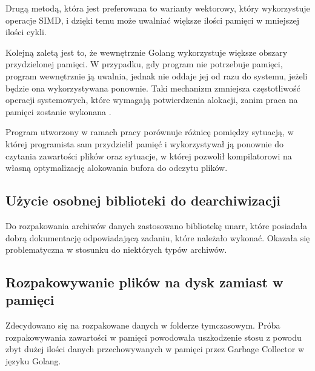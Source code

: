 Drugą metodą, która jest preferowana to warianty wektorowy, który wykorzystuje 
operacje SIMD, i dzięki temu może uwalniać większe ilości pamięci w mniejszej
ilości cykli. 

Kolejną zaletą jest to, że wewnętrznie Golang wykorzystuje większe obszary
przydzielonej pamięci. W przypadku, gdy program nie potrzebuje pamięci, program
wewnętrznie ją uwalnia, jednak nie oddaje jej od razu do systemu, jeżeli będzie 
ona wykorzystywana ponownie. Taki mechanizm zmniejsza częstotliwość operacji
systemowych, które wymagają potwierdzenia alokacji, zanim praca na pamięci 
zostanie wykonana \cite{bib:internet:GolangMemoryModel}. 

Program utworzony w ramach pracy porównuje różnicę pomiędzy sytuacją, w której
programista sam przydzielił pamięć i wykorzystywał ją ponownie do czytania 
zawartości plików oraz sytuacje, w której pozwolił kompilatorowi na własną
optymalizację alokowania bufora do odczytu plików.

\subsection{Użycie osobnej biblioteki do dearchiwizacji}

Do rozpakowania archiwów danych zastosowano bibliotekę unarr, które posiadała
dobrą dokumentację odpowiadającą zadaniu, które należało wykonać. Okazała się
problematyczna w stosunku do niektórych typów archiwów.

\subsection{Rozpakowywanie plików na dysk zamiast w pamięci}

Zdecydowano się na rozpakowane danych w folderze tymczasowym. Próba 
rozpakowywania zawartości w pamięci powodowała uszkodzenie stosu z powodu zbyt
dużej ilości danych przechowywanych w pamięci przez Garbage Collector w języku Golang.

